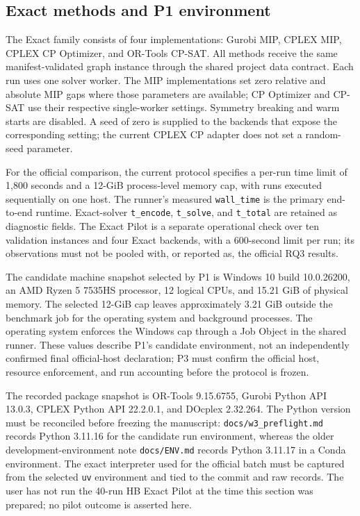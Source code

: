 \subsection{Exact methods and P1 environment}
\label{subsec:exact-setup}

The Exact family consists of four implementations: Gurobi MIP, CPLEX MIP, CPLEX CP Optimizer, and OR-Tools CP-SAT. All methods receive the same manifest-validated graph instance through the shared project data contract. Each run uses one solver worker. The MIP implementations set zero relative and absolute MIP gaps where those parameters are available; CP Optimizer and CP-SAT use their respective single-worker settings. Symmetry breaking and warm starts are disabled. A seed of zero is supplied to the backends that expose the corresponding setting; the current CPLEX CP adapter does not set a random-seed parameter.

For the official comparison, the current protocol specifies a per-run time limit of 1,800 seconds and a 12-GiB process-level memory cap, with runs executed sequentially on one host. The runner's measured \texttt{wall\_time} is the primary end-to-end runtime. Exact-solver \texttt{t\_encode}, \texttt{t\_solve}, and \texttt{t\_total} are retained as diagnostic fields. The Exact Pilot is a separate operational check over ten validation instances and four Exact backends, with a 600-second limit per run; its observations must not be pooled with, or reported as, the official RQ3 results.

The candidate machine snapshot selected by P1 is Windows 10 build 10.0.26200, an AMD Ryzen 5 7535HS processor, 12 logical CPUs, and 15.21 GiB of physical memory. The selected 12-GiB cap leaves approximately 3.21 GiB outside the benchmark job for the operating system and background processes. The operating system enforces the Windows cap through a Job Object in the shared runner. These values describe P1's candidate environment, not an independently confirmed final official-host declaration; P3 must confirm the official host, resource enforcement, and run accounting before the protocol is frozen.

The recorded package snapshot is OR-Tools 9.15.6755, Gurobi Python API 13.0.3, CPLEX Python API 22.2.0.1, and DOcplex 2.32.264. The Python version must be reconciled before freezing the manuscript: \texttt{docs/w3\_preflight.md} records Python 3.11.16 for the candidate run environment, whereas the older development-environment note \texttt{docs/ENV.md} records Python 3.11.17 in a Conda environment. The exact interpreter used for the official batch must be captured from the selected \texttt{uv} environment and tied to the commit and raw records. The user has not run the 40-run HB Exact Pilot at the time this section was prepared; no pilot outcome is asserted here.

